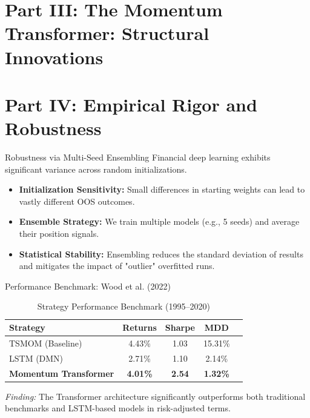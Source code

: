 \section{Part III: The Momentum Transformer: Structural Innovations}



\section{Part IV: Empirical Rigor and Robustness}



\begin{frame}{Robustness via Multi-Seed Ensembling}
    Financial deep learning exhibits significant variance across random initializations.
    \begin{itemize}
        \item \textbf{Initialization Sensitivity:} Small differences in starting weights can lead to vastly different OOS outcomes.
        \item \textbf{Ensemble Strategy:} We train multiple models (e.g., 5 seeds) and average their position signals.
        \item \textbf{Statistical Stability:} Ensembling reduces the standard deviation of results and mitigates the impact of "outlier" overfitted runs.
    \end{itemize}
\end{frame}

\begin{frame}{Performance Benchmark: Wood et al. (2022)}
    \begin{table}
    \centering
    \begin{tabular}{lcccc}
    \toprule
    \textbf{Strategy} & \textbf{Returns} & \textbf{Sharpe} & \textbf{MDD} \\
    \midrule
    TSMOM (Baseline) & 4.43\% & 1.03 & 15.31\% \\
    LSTM (DMN) & 2.71\% & 1.10 & 2.14\% \\
    \textbf{Momentum Transformer} & \textbf{4.01\%} & \textbf{2.54} & \textbf{1.32\%} \\
    \bottomrule
    \end{tabular}
    \caption{Strategy Performance Benchmark (1995--2020)}
    \end{table}
    \textit{Finding:} The Transformer architecture significantly outperforms both traditional benchmarks and LSTM-based models in risk-adjusted terms.
\end{frame}

